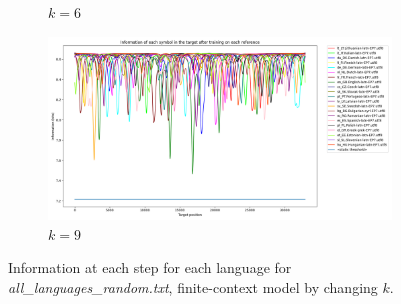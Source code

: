 \documentclass{article}
\begin{document}
\begin{figure}
\begin{subfigure}[b]{0.3\textwidth}
\begin{center}
        \end{center}
        \caption{$k = 6$}
        \label{fig:all_languages_random_p_c:1:6}
    \end{subfigure}
    \hfill
    \begin{subfigure}[b]{0.3\textwidth}
        \begin{center}
            \includegraphics[width=1.0\linewidth]{../results/all_languages_random/-p_c:1:9.png}
        \end{center}
        \caption{$k = 9$}
        \label{fig:all_languages_random_p_c:1:9}
    \end{subfigure}
    
    \caption{Information at each step for each language for \textit{all\_languages\_random.txt}, finite-context model by changing $k$.}
    \label{fig:all_languages_random_p_c}
\end{figure}
\end{document}
